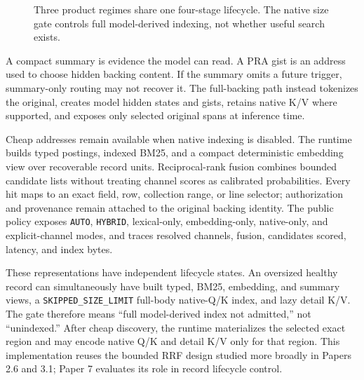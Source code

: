 \documentclass[11pt]{article}
\begin{document}
\begin{figure}[t]
\centering
{}
\caption{Three product regimes share one four-stage lifecycle. The native size
gate controls full model-derived indexing, not whether useful search exists.}
\label{fig:architecture}
\end{figure}

A compact summary is evidence the model can read. A PRA gist is an address used
to choose hidden backing content. If the summary omits a future trigger,
summary-only routing may not recover it. The full-backing path instead tokenizes
the original, creates model hidden states and gists, retains native K/V where
supported, and exposes only selected original spans at inference time.

Cheap addresses remain available when native indexing is disabled. The runtime
builds typed postings, indexed BM25, and a compact deterministic embedding
view over recoverable record units. Reciprocal-rank fusion combines bounded
candidate lists without treating channel scores as calibrated probabilities.
Every hit maps to an exact field, row, collection range, or line selector;
authorization and provenance remain attached to the original backing identity.
The public policy exposes \texttt{AUTO}, \texttt{HYBRID}, lexical-only,
embedding-only, native-only, and explicit-channel modes, and traces resolved
channels, fusion, candidates scored, latency, and index bytes.

These representations have independent lifecycle states. An oversized healthy
record can simultaneously have built typed, BM25, embedding, and summary views,
a \texttt{SKIPPED\_SIZE\_LIMIT} full-body native-Q/K index, and lazy detail
K/V. The gate therefore means ``full model-derived index not admitted,'' not
``unindexed.'' After cheap discovery, the runtime materializes the selected
exact region and may encode native Q/K and detail K/V only for that region.
This implementation reuses the bounded RRF design studied more broadly in
Papers 2.6 and 3.1; Paper 7 evaluates its role in record lifecycle control.
\end{document}
